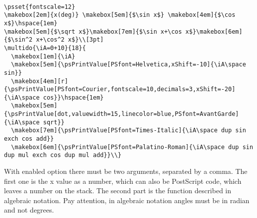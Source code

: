 \documentclass[11pt,english,BCOR10mm,DIV12,bibliography=totoc,parskip=false,
   smallheadings, headexclude,footexclude,oneside]{pst-doc}
\begin{document}
\begin{center}
  \hspace{1em}
\\[3pt]
\end{center}

\bigskip

\begin{lstlisting}
\psset{fontscale=12}
\makebox[2em]{x(deg)} \makebox[5em]{$\sin x$} \makebox[4em]{$\cos x$}\hspace{1em}
\makebox[5em]{$\sqrt x$}\makebox[7em]{$\sin x+\cos x$}\makebox[6em]{$\sin^2 x+\cos^2 x$}\\[3pt]
\multido{\iA=0+10}{18}{
  \makebox[1em]{\iA}
  \makebox[5em]{\psPrintValue[PSfont=Helvetica,xShift=-10]{\iA\space sin}}
  \makebox[4em][r]{\psPrintValue[PSfont=Courier,fontscale=10,decimals=3,xShift=-20]{\iA\space cos}}\hspace{1em}
  \makebox[5em]{\psPrintValue[dot,valuewidth=15,linecolor=blue,PSfont=AvantGarde]{\iA\space sqrt}}
  \makebox[7em]{\psPrintValue[PSfont=Times-Italic]{\iA\space dup sin exch cos add}}
  \makebox[6em]{\psPrintValue[PSfont=Palatino-Roman]{\iA\space dup sin dup mul exch cos dup mul add}}\\}
\end{lstlisting}

With enabled  option there must be two arguments, separated by a comma.
The first one is the x value as a number, which can also be PostScript code, which leaves a
number on the stack. The second part is the function described in algebraic notation.
Pay attention, in algebraic notation angles must be in radian and not degrees.
\end{document}

